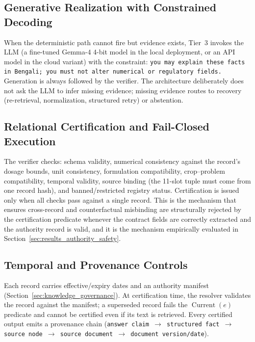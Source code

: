\subsection{Generative Realization with Constrained Decoding}
When the deterministic path cannot fire but evidence exists, Tier~3 invokes the LLM (a fine-tuned Gemma-4 4-bit model in the local deployment, or an API model in the cloud variant) with the constraint: \texttt{you may explain these facts in Bengali; you must not alter numerical or regulatory fields.} Generation is always followed by the verifier. The architecture deliberately does not ask the LLM to infer missing evidence; missing evidence routes to recovery (re-retrieval, normalization, structured retry) or abstention.

\subsection{Relational Certification and Fail-Closed Execution}
The verifier checks: schema validity, numerical consistency against the record's dosage bounds, unit consistency, formulation compatibility, crop--problem compatibility, temporal validity, source binding (the 11-slot tuple must come from one record hash), and banned/restricted registry status. Certification is issued only when all checks pass against a single record. This is the mechanism that ensures cross-record and counterfactual misbinding are structurally rejected by the certification predicate whenever the contract fields are correctly extracted and the authority record is valid, and it is the mechanism empirically evaluated in Section~\ref{sec:results_authority_safety}.

\subsection{Temporal and Provenance Controls}
Each record carries effective/expiry dates and an authority manifest (Section~\ref{sec:knowledge_governance}). At certification time, the resolver validates the record against the manifest; a superseded record fails the $\operatorname{Current}(e)$ predicate and cannot be certified even if its text is retrieved. Every certified output emits a provenance chain (\texttt{answer claim $\rightarrow$ structured fact $\rightarrow$ source node $\rightarrow$ source document $\rightarrow$ document version/date}).

